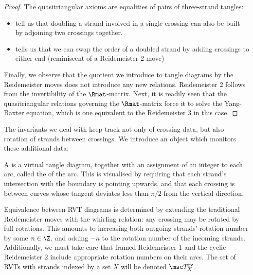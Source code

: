 \documentclass{article}
\begin{document}
\begin{proof}
        The quasitriangular axioms are equalities of pairs of three-strand
        tangles:
        \begin{itemize}
                \item {} tell us that
                        doubling a strand involved in a single crossing can also
                        be built by adjoining two crossings together.
                \item {} tells us that we can swap the order
                        of a doubled strand by adding crossings to either end
                        (reminiscent of a Reidemeister 2 move)
        \end{itemize}

        Finally, we observe that the quotient we introduce to tangle diagrams by
        the Reidemeister moves does not introduce any new relations.
        Reidemeister 2 follows from the invertibility of the $\Rmat$-matrix.
        Next, it is readily seen that the quasitriangular relations governing
        the $\Rmat$-matrix force it to solve the Yang-Baxter equation, which is
        one equivalent to the Reidemeister 3 in this case.
\end{proof}

The invariants we deal with keep track not only of crossing data, but also
rotation of strands between crossings. We introduce an object which monitors
these additional data:
\begin{definition}
        A  is a virtual tangle diagram, together with an
        assignment of an integer to each arc, called the 
        of the arc. This is visualised by requiring that each strand's
        intersection with the boundary is pointing upwards, and that each
        crossing is between curves whose tangent deviates less than $π/2$ from
        the vertical direction.

        Equivalence between \ac{RVT} diagrams is determined by extending the
        traditional Reidemeister moves with the whirling relation: any crossing
        may be rotated by full rotations. This amounts to increasing both
        outgoing strands' rotation number by some $n\in\Z$, and adding $-n$ to
        the rotation number of the incoming strands.
        Additionally, we must take care that framed Reidemeister 1 and the
        cyclic Reidemeister 2 include appropriate rotation numbers on their
        arcs. %
        The set of \acp{RVT} with strands indexed by a set $X$ will be denoted
        $\RVT_X$.
\end{definition}
\end{document}
